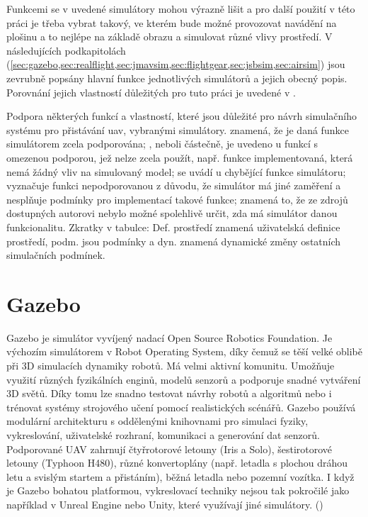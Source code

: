     Funkcemi se v  uvedené simulátory mohou výrazně lišit a pro další použití v této práci je třeba vybrat takový, ve kterém bude možné provozovat navádění na plošinu a to nejlépe na základě obrazu a simulovat různé vlivy prostředí. V následujících podkapitolách (\cref{sec:gazebo,sec:realflight,sec:jmavsim,sec:flightgear,sec:jsbsim,sec:airsim}) jsou zevrubně popsány hlavní funkce jednotlivých simulátorů a jejich obecný popis. Porovnání jejich vlastností důležitých pro tuto práci je uvedené v .

    \begin{table}
        \centering
        
        \caption[Vlastnosti vybraných simulátorů]{Podpora některých funkcí a vlastností, které jsou důležité pro návrh simulačního systému pro přistávání \acrshort{uav}, vybranými simulátory.  znamená, že je daná funkce simulátorem zcela podporována; , neboli částečně, je uvedeno u funkcí s omezenou podporou, jež nelze zcela použít, např. funkce implementovaná, která nemá žádný vliv na simulovaný model;  se uvádí u chybějící funkce simulátoru; \uv{-} vyznačuje funkci nepodporovanou z důvodu, že simulátor má jiné zaměření a nesplňuje podmínky pro implementací takové funkce;  znamená to, že ze zdrojů dostupných autorovi nebylo možné spolehlivě určit, zda má simulátor danou funkcionalitu. Zkratky v tabulce: Def. prostředí znamená uživatelská definice prostředí, podm. jsou podmínky a dyn. znamená dynamické změny ostatních simulačních podmínek.}
        \label{tab:simsfeatures}
    \end{table}

    \section{Gazebo} \label{sec:gazebo}
        Gazebo je simulátor vyvíjený nadací Open Source Robotics Foundation. Je výchozím simulátorem v Robot Operating System, díky čemuž se těší velké oblibě při 3D simulacích dynamiky robotů. Má velmi aktivní komunitu. Umožňuje využití různých fyzikálních enginů, modelů senzorů a podporuje snadné vytváření 3D světů. Díky tomu lze snadno testovat návrhy robotů a algoritmů nebo i trénovat systémy strojového učení pomocí realistických scénářů. Gazebo používá modulární architekturu s oddělenými knihovnami pro simulaci fyziky, vykreslování, uživatelské rozhraní, komunikaci a generování dat senzorů. Podporované UAV zahrnují čtyřrotorové letouny (Iris a Solo), šestirotorové letouny (Typhoon H480), různé konvertoplány (např. letadla s plochou dráhou letu a svislým startem a přistáním), běžná letadla nebo pozemní vozítka. I když je Gazebo bohatou platformou, vykreslovací techniky nejsou tak pokročilé jako například v Unreal Engine nebo Unity, které využívají jiné simulátory. (\cite{Ebeid2018})
    
